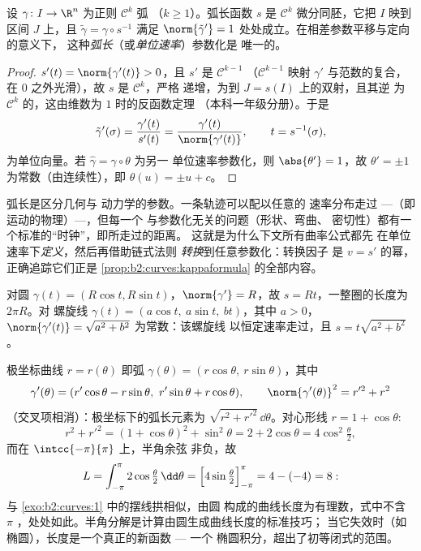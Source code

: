 \begin{theorem}[弧长参数化]\label{thm:b2:curves:arclength}
设 $\gamma \colon I \to \R^n$ 为正则 $\mathcal{C}^k$ 弧
（$k \geq 1$）。弧长函数 $s$ 是 $\mathcal{C}^k$
微分同胚，它把 $I$ 映到区间 $J$ 上，且 $\tilde\gamma =
\gamma \circ s^{-1}$ 满足 $\norm{\tilde\gamma'} = 1$
处处成立。在相差参数平移与定向的意义下，
这种\emph{弧长}（或\emph{单位速率}）参数化是
唯一的。
\end{theorem}

\begin{proof}
$s'(t) = \norm{\gamma'(t)} > 0$，且 $s'$ 是 $\mathcal{C}^{k-1}$
（$\mathcal{C}^{k-1}$ 映射 $\gamma'$ 与范数的复合，
在 $0$ 之外光滑），故 $s$ 是 $\mathcal{C}^k$，严格
递增，为到 $J = s(I)$ 上的双射，且其逆
为 $\mathcal{C}^k$ 的，这由维数为 $1$ 时的反函数定理
（本科一年级分册）。于是
\[
\tilde\gamma'(\sigma)
= \frac{\gamma'(t)}{s'(t)}
= \frac{\gamma'(t)}{\norm{\gamma'(t)}},
\qquad t = s^{-1}(\sigma),
\]
为单位向量。若 $\hat\gamma = \gamma\circ\theta$ 为另一
单位速率参数化，则 $\abs{\theta'} = 1$，故 $\theta'
= \pm 1$ 为常数（由连续性），即 $\theta(u) = \pm u + c$。
\end{proof}

\begin{remark}
弧长是区分几何与
动力学的参数。一条轨迹可以配以任意的
速率分布走过 ---（即运动的物理）---，但每一个
与参数化无关的问题（形状、弯曲、
密切性）都有一个标准的“时钟”，即所走过的距离。
这就是为什么下文所有曲率公式都先
在单位速率下\emph{定义}，然后再借助链式法则
\emph{转换}到任意参数化：转换因子
是 $v = s'$ 的幂，正确追踪它们正是
\cref{prop:b2:curves:kappaformula} 的全部内容。
\end{remark}

\begin{example}[圆与螺旋线]\label{ex:b2:curves:helix}
对圆 $\gamma(t) = (R\cos t, R\sin t)$，$\norm{\gamma'} =
R$，故 $s = Rt$，一整圈的长度为 $2\pi R$。对
螺旋线 $\gamma(t) = (a\cos t,\ a\sin t,\ bt)$，其中 $a > 0$，
$\norm{\gamma'(t)} = \sqrt{a^2 + b^2}$ 为常数：该螺旋线
以恒定速率走过，且 $s = t\sqrt{a^2 + b^2}$。
\end{example}

\begin{example}[极坐标中的
弧长]\label{ex:b2:curves:polarlength}
极坐标曲线 $r = r(\theta)$ 即弧 $\gamma(\theta) =
(r\cos\theta,\ r\sin\theta)$，其中
\[
\gamma'(\theta) = (r'\cos\theta - r\sin\theta,\
r'\sin\theta + r\cos\theta),
\qquad
\norm{\gamma'(\theta)}^2 = r'^2 + r^2
\]
（交叉项相消）：极坐标下的弧长元素为
$\sqrt{r^2 + r'^2}\,\dd\theta$。对心形线 $r = 1 +
\cos\theta$:
\[
r^2 + r'^2 = (1 + \cos\theta)^2 + \sin^2\theta = 2 +
2\cos\theta = 4\cos^2\tfrac\theta2,
\]
而在 $\intcc{-\pi}{\pi}$ 上，半角余弦
非负，故
\[
L = \int_{-\pi}^{\pi}2\cos\tfrac\theta2\,\dd\theta
= \Bigl[4\sin\tfrac\theta2\Bigr]_{-\pi}^{\pi}
= 4 - (-4) = 8 :
\]
与 \cref{exo:b2:curves:1} 中的摆线拱相似，由圆
构成的曲线长度为有理数，式中不含 $\pi$
，处处如此。半角分解是计算由圆生成曲线长度的标准技巧；
当它失效时（如
椭圆），长度是一个真正的新函数 --- 一个
椭圆积分，超出了初等闭式的范围。
\end{example}

